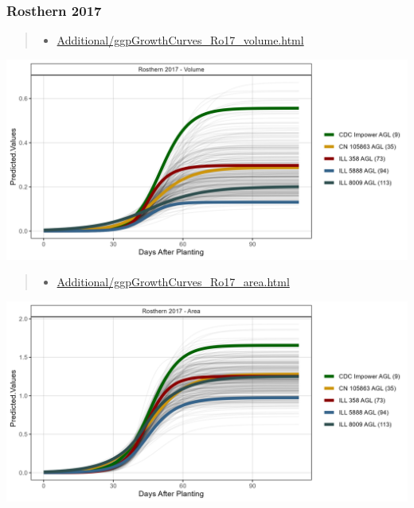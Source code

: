 \documentclass[
]{article}
\providecommand{\tightlist}{%
  \setlength{\itemsep}{0pt}\setlength{\parskip}{0pt}}
\begin{document}
\subsubsection{Rosthern 2017}\label{rosthern-2017}

\begin{quote}
\begin{itemize}
\tightlist
\item
  \href{https://derekmichaelwright.github.io/AGILE_LDP_UAV/Additional/ggpGrowthCurves_Ro17_volume.html}{Additional/ggpGrowthCurves\_Ro17\_volume.html}
\end{itemize}
\end{quote}

\includegraphics{Additional/ggGrowthCurves_Ro17_volume.png}

\begin{quote}
\begin{itemize}
\tightlist
\item
  \href{https://derekmichaelwright.github.io/AGILE_LDP_UAV/Additional/ggpGrowthCurves_Ro17_area.html}{Additional/ggpGrowthCurves\_Ro17\_area.html}
\end{itemize}
\end{quote}

\includegraphics{Additional/ggGrowthCurves_Ro17_area.png}
\end{document}
